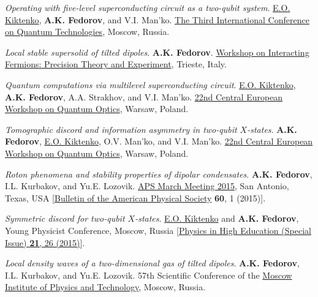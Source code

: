 \documentclass[10pt,a4paper,sans]{moderncv}
\begin{document}
	{\textit{Operating with five-level superconducting circuit as a two-qubit system}.
	\underline{E.O. Kiktenko}, \textbf{A.K. Fedorov}, and V.I. Man'ko.
	\textcolor{blue}{\href{http://conference.rqc.ru}{The Third International Conference on Quantum Technologies}}, Moscow, Russia.}

	{\textit{Local stable supersolid of tilted dipoles}.
	\textbf{A.K. Fedorov}.
	\textcolor{blue}{\href{http://indico.ictp.it/event/a14248/}{Workshop on Interacting Fermions: Precision Theory and Experiment}}, Trieste, Italy.}

	{\textit{Quantum computations via multilevel superconducting circuit}.
	\underline{E.O. Kiktenko}, \textbf{A.K. Fedorov}, A.A. Strakhov, and V.I. Man'ko.
	\textcolor{blue}{\href{http://cewqo2015.fuw.edu.pl}{22nd Central European Workshop on Quantum Optics}}, Warsaw, Poland.}
	
	{\textit{Tomographic discord and information asymmetry in two-qubit $X$-states}.
	\textbf{A.K. Fedorov}, \underline{E.O. Kiktenko}, O.V. Man'ko, and V.I. Man'ko.
	\textcolor{blue}{\href{http://cewqo2015.fuw.edu.pl}{22nd Central European Workshop on Quantum Optics}}, Warsaw, Poland.}
	
	{\textit{Roton phenomena and stability properties of dipolar condensates}.
	\textbf{A.K. Fedorov}, I.L. Kurbakov, and Yu.E. Lozovik.
	\textcolor{blue}{\href{http://www.rqc.ru/events/?ELEMENT_ID=888}{APS March Meeting 2015}},
	San Antonio, Texas, USA
	[\textcolor{blue}{\href{http://dx.doi.org/10.1088/1742-6596/414/1/012036}{Bulletin of the American Physical Society}}
	\textbf{60}, 1 (2015)].}

	{\textit{Symmetric discord for two-qubit $X$-states}.
	\underline{E.O. Kiktenko} and \textbf{A.K. Fedorov},
	Young Physicist Conference, Moscow, Russia
	[\textcolor{blue}{\href{http://konkmolphys.moomfo.ru/application/2015}{Physics in High Education (Special Issue) \textbf{21}, 26 (2015)}}].}

	{\textit{Local density waves of a two-dimensional gas of tilted dipoles}.
	\textbf{A.K. Fedorov}, I.L. Kurbakov, and Yu.E. Lozovik.
	57th Scientific Conference of the \textcolor{blue}{\href{http://mipt.ru/en/}{Moscow Institute of Physics and Technology}}, 
	Moscow, Russia.}
\end{document}
